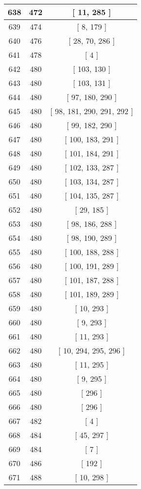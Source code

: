 \begin{center}
\begin{longtable}[H]{|| c c c ||}
\hline
638 & 472 & [ 11, 285 ] \\ 
\hline
639 & 474 & [ 8, 179 ] \\ 
\hline
640 & 476 & [ 28, 70, 286 ] \\ 
\hline
641 & 478 & [ 4 ] \\ 
\hline
642 & 480 & [ 103, 130 ] \\ 
\hline
643 & 480 & [ 103, 131 ] \\ 
\hline
644 & 480 & [ 97, 180, 290 ] \\ 
\hline
645 & 480 & [ 98, 181, 290, 291, 292 ] \\ 
\hline
646 & 480 & [ 99, 182, 290 ] \\ 
\hline
647 & 480 & [ 100, 183, 291 ] \\ 
\hline
648 & 480 & [ 101, 184, 291 ] \\ 
\hline
649 & 480 & [ 102, 133, 287 ] \\ 
\hline
650 & 480 & [ 103, 134, 287 ] \\ 
\hline
651 & 480 & [ 104, 135, 287 ] \\ 
\hline
652 & 480 & [ 29, 185 ] \\ 
\hline
653 & 480 & [ 98, 186, 288 ] \\ 
\hline
654 & 480 & [ 98, 190, 289 ] \\ 
\hline
655 & 480 & [ 100, 188, 288 ] \\ 
\hline
656 & 480 & [ 100, 191, 289 ] \\ 
\hline
657 & 480 & [ 101, 187, 288 ] \\ 
\hline
658 & 480 & [ 101, 189, 289 ] \\ 
\hline
659 & 480 & [ 10, 293 ] \\ 
\hline
660 & 480 & [ 9, 293 ] \\ 
\hline
661 & 480 & [ 11, 293 ] \\ 
\hline
662 & 480 & [ 10, 294, 295, 296 ] \\ 
\hline
663 & 480 & [ 11, 295 ] \\ 
\hline
664 & 480 & [ 9, 295 ] \\ 
\hline
665 & 480 & [ 296 ] \\ 
\hline
666 & 480 & [ 296 ] \\ 
\hline
667 & 482 & [ 4 ] \\ 
\hline
668 & 484 & [ 45, 297 ] \\ 
\hline
669 & 484 & [ 7 ] \\ 
\hline
670 & 486 & [ 192 ] \\ 
\hline
671 & 488 & [ 10, 298 ] \\ 

\end{longtable}
\end{center}
